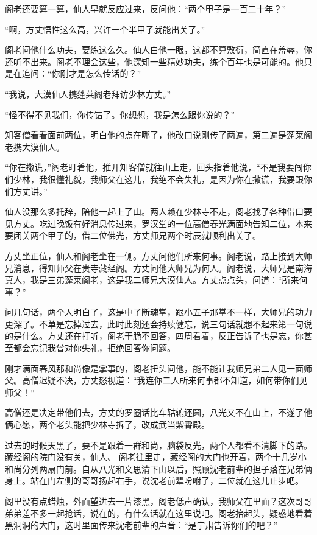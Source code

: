 阁老还要算一算，仙人早就反应过来，反问他：“两个甲子是一百二十年？”

“啊，方丈悟性这么高，兴许一个半甲子就能出关了。”

阁老问他什么功夫，要练这么久。仙人白他一眼，这都不算敷衍，简直在羞辱，你还听不出来。阁老不理会这些，他深知一些精妙功夫，练个百年也是可能的。他只是在追问：“你刚才是怎么传话的？”

“我说，大漠仙人携蓬莱阁老拜访少林方丈。”

“怪不得不见我们，你传错了。你想想，我是怎么跟你说的？”

知客僧看看面前两位，明白他的点在哪了，他改口说刚传了两遍，第二遍是蓬莱阁老携大漠仙人。

“你在撒谎，”阁老盯着他，推开知客僧就往山上走，回头指着他说，“不是我要闯你们少林，我很懂礼貌，我师父在这儿，我绝不会失礼，是因为你在撒谎，我要跟你们方丈讲。”

仙人没那么多托辞，陪他一起上了山。两人赖在少林寺不走，阁老找了各种借口要见方丈。吃过晚饭有好消息传过来，罗汉堂的一位高僧春光满面地告知二位，本来要闭关两个甲子的，借二位佛光，方丈师兄两个时辰就顺利出关了。

方丈坐正位，仙人和阁老坐在一侧。方丈问他们所来何事。阁老说，路上接到大师兄消息，得知师父在贵寺藏经阁。方丈问他大师兄为何人。阁老说，大师兄是南海真人，我是三弟蓬莱阁老，这是我二师兄大漠仙人。方丈点点头，问道：“所来何事？”

问几句话，两个人明白了，这是中了断魂掌，跟小五子那掌不一样，大师兄的功力更深了。不单是忘掉过去，此时此刻还会持续健忘，说三句话就想不起来第一句说的是什么。方丈还在打听，阁老干脆不回答，四周看着，反正告诉了也是忘，你甚至都会忘记我曾对你失礼，拒绝回答你问题。

刚才满面春风那和尚像是掌事的，阁老扭头问他，能不能让我师兄弟二人见一面师父。高僧迟疑不决，方丈怒视道：“我连你二人所来何事都不知道，如何带你们见师父！”

高僧还是决定带他们去，方丈的罗圈话比车轱辘还圆，八光又不在山上，不遂了他俩心愿，两个老头能把少林寺拆了，改成武当紫霄殿。

过去的时候天黑了，要不是跟着一群和尚，脑袋反光，两个人都看不清脚下的路。藏经阁的院门没有关，仙人、
阁老往里走，藏经阁的大门也开着，两个十几岁小和尚分列两扇门前。自从八光和文思清下山以后，照顾沈老前辈的担子落在兄弟俩身上。站在门左侧的哥哥扬起右手，说沈老前辈吩咐了，二位就在这儿止步吧。

阁里没有点蜡烛，外面望进去一片漆黑，阁老低声确认，我师父在里面？这次哥哥弟弟差不多一起抢话，说在的，有什么话就在这里说吧。阁老抬起头，疑惑地看着黑洞洞的大门，这时里面传来沈老前辈的声音：“是宁肃告诉你们的吧？”

